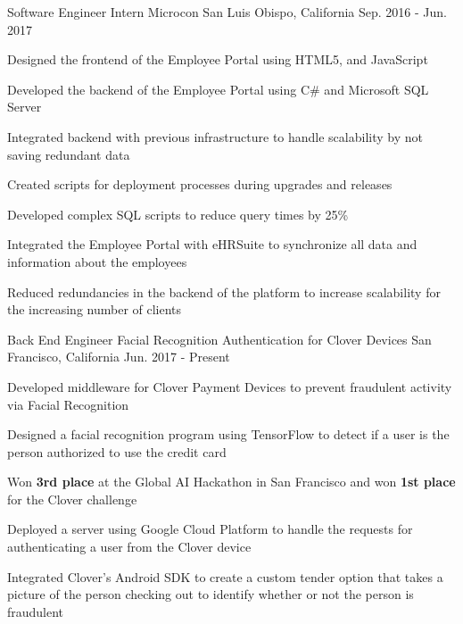 \begin{cventries}
\cventry
{Software Engineer Intern} %
{Microcon} %
{San Luis Obispo, California} %
{Sep. 2016 - Jun. 2017} %
{ %
\begin{cvitems}
\item {Designed the frontend of the Employee Portal using HTML5, and JavaScript}
\item {Developed the backend of the Employee Portal using C\# and Microsoft SQL Server}
\item {Integrated backend with previous infrastructure to handle scalability by not saving redundant data}
\item {Created scripts for deployment processes during upgrades and releases}
\item {Developed complex SQL scripts to reduce query times by 25\%}
\item {Integrated the Employee Portal with eHRSuite to synchronize all data and information about the employees}
\item {Reduced redundancies in the backend of the platform to increase scalability for the increasing number of clients}
\end{cvitems}
}



\cventry
{Back End Engineer} %
{Facial Recognition Authentication for Clover Devices} %
{San Francisco, California} %
{Jun. 2017 - Present} %
{ %
\begin{cvitems}
\item {Developed middleware for Clover Payment Devices to prevent fraudulent activity via Facial Recognition}
\item {Designed a facial recognition program using TensorFlow to detect if a user is the person authorized to use the credit card}
\item {Won \textbf{3rd place} at the Global AI Hackathon in San Francisco and won \textbf{1st place} for the Clover challenge}
\item {Deployed a server using Google Cloud Platform to handle the requests for authenticating a user from the Clover device}
\item {Integrated Clover's Android SDK to create a custom tender option that takes a picture of the person checking out to identify whether or not the person is fraudulent}
\end{cvitems}
}


\end{cventries}
